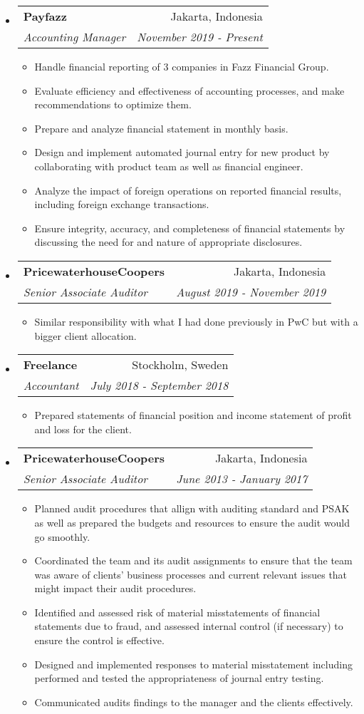 \documentclass[letterpaper,9pt]{article}
\makeatletter
\newcommand{\resitem}[1]{\item #1 \vspace{-2pt}}
\newcommand{\ressubheading}[4]{
\begin{tabular*}{6.5in}{l@{\cftdotfill{\cftsecdotsep}\extracolsep{\fill}}r}
		\textbf{#1} & #2 \\
		\textit{#3} & \textit{#4} \\
\end{tabular*}\vspace{-6pt}}
\makeatother
\begin{document}
\begin{itemize}

  \item 
  \ressubheading{Payfazz}{Jakarta, Indonesia}{Accounting Manager}{November 2019 - Present}
  \begin{itemize}
    \resitem{Handle financial reporting of 3 companies in Fazz Financial Group.}
    \resitem{Evaluate efficiency and effectiveness of accounting processes, and make recommendations to optimize them.}
    \resitem{Prepare and analyze financial statement in monthly basis.}
    \resitem{Design and implement automated journal entry for new product by collaborating with product team as well as financial engineer.}
    \resitem{Analyze the impact of foreign operations on reported financial results, including foreign exchange transactions.}
    \resitem{Ensure integrity, accuracy, and completeness of financial statements by discussing the need for and nature of appropriate disclosures.}
  \end{itemize}

\item 
\ressubheading{PricewaterhouseCoopers}{Jakarta, Indonesia}{Senior Associate Auditor}{August 2019 - November 2019}
\begin{itemize}
  \resitem{Similar responsibility with what I had done previously in PwC but with a bigger client allocation.}
\end{itemize}


\item
\ressubheading{Freelance}{Stockholm, Sweden}{Accountant}{July 2018 - September 2018}
\begin{itemize}
  \resitem{Prepared statements of financial position and income statement of profit and loss for the client.}
\end{itemize}

\item
	\ressubheading{PricewaterhouseCoopers}{Jakarta, Indonesia}{Senior Associate Auditor}{June 2013 - January 2017}
  \begin{itemize}
    \resitem{Planned audit procedures that allign with auditing standard and PSAK as well as prepared the budgets and resources to ensure the audit would go smoothly.}
    \resitem{Coordinated the team and its audit assignments to ensure that the team was aware of clients' business processes and current relevant issues that might impact their audit procedures.}
    \resitem{Identified and assessed risk of material misstatements of financial statements due to fraud, and assessed internal control (if necessary) to ensure the control is effective.}
    \resitem{Designed and implemented responses to material misstatement including performed and tested the appropriateness of  journal entry testing.}
    \resitem{Communicated audits findings to the manager and the clients effectively.}
	\end{itemize}


\end{itemize}
\end{document}
